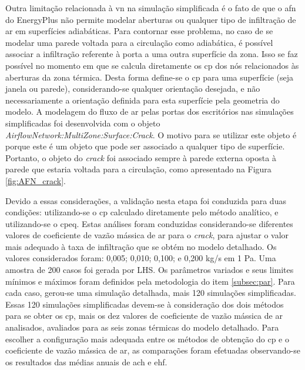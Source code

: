 Outra limitação relacionada à \acrshort{vn} na simulação simplificada é o fato de que o \acrshort{afn} do EnergyPlus não permite modelar aberturas ou qualquer tipo de infiltração de ar em superfícies adiabáticas. Para contornar esse problema, no caso de se modelar uma parede voltada para a circulação como adiabática, é possível associar a infiltração referente à porta a uma outra superfície da zona.  %
Isso se faz possível no momento em que se calcula diretamente os \acrfull{cp} dos nós relacionados às aberturas da zona térmica.
Desta forma define-se o \acrshort{cp} para uma superfície (seja janela ou parede), considerando-se qualquer orientação desejada, e não necessariamente a orientação definida para esta superfície pela geometria do modelo.		
A modelagem do fluxo de ar pelas portas dos escritórios nas simulações simplificadas foi desenvolvida com o objeto \textit{AirflowNetwork:MultiZone:Surface:Crack}. O motivo para se utilizar este objeto é porque este é um objeto que pode ser associado a qualquer tipo de superfície. Portanto, o objeto do \textit{crack} foi associado sempre à parede externa oposta à parede que estaria voltada para a circulação, como apresentado na Figura \ref{fig:AFN_crack}.

Devido a essas considerações, a validação nesta etapa foi conduzida para duas condições: utilizando-se o \acrshort{cp} calculado diretamente pelo método analítico, e utilizando-se o \acrfull{cpeq}.		
Estas análises foram conduzidas considerando-se diferentes valores de coeficiente de vazão mássica de ar para o \textit{crack}, para ajustar o valor mais adequado à taxa de infiltração que se obtém no modelo detalhado. Os valores considerados foram: 0,005; 0,010; 0,100; e 0,200 kg/s em 1 Pa.
Uma amostra de 200 casos foi gerada por LHS.
Os parâmetros variados e seus limites mínimos e máximos foram definidos pela metodologia do item \ref{subsec:par}.
Para cada caso, gerou-se uma simulação detalhada, mais 120 simulações simplificadas. Essas 120 simulações simplificadas devem-se à consideração dos dois métodos para se obter os \acrshort{cp}, mais os dez valores de coeficiente de vazão mássica de ar analisados, avaliados para as seis zonas térmicas do modelo detalhado. 
Para escolher a configuração mais adequada entre os métodos de obtenção do \acrshort{cp} e o coeficiente de vazão mássica de ar, as comparações foram efetuadas observando-se os resultados das médias anuais de \acrshort{ach} e \acrshort{ehf}.

